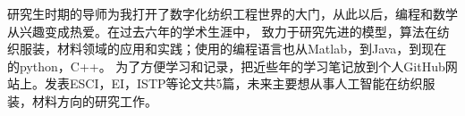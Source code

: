 \cvsection{}


\begin{cvparagraph}
研究生时期的导师为我打开了数字化纺织工程世界的大门，从此以后，编程和数学从兴趣变成热爱。在过去六年的学术生涯中，
致力于研究先进的模型，算法在纺织服装，材料领域的应用和实践；使用的编程语言也从Matlab，到Java，到现在的python，C++。
为了方便学习和记录，把近些年的学习笔记放到个人GitHub网站上。发表ESCI，EI，ISTP等论文共5篇，未来主要想从事人工智能在纺织服装，材料方向的研究工作。
\end{cvparagraph}
